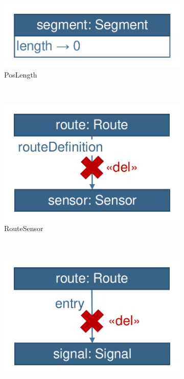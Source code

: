 \begin{figure}
        \centering
        \begin{subfigure}[b]{0.3\textwidth}
        		\centering
                \includegraphics[scale=0.35]{figures/trainbenchmark-transformation-user-poslength}
                \caption{\textsf{PosLength}}
                \label{fig:trainbenchmark-transformation-user-poslength}
        \end{subfigure}
        ~
        \begin{subfigure}[b]{0.3\textwidth}
                \centering
                \includegraphics[scale=0.35]{figures/trainbenchmark-transformation-user-routesensor}
                \caption{\textsf{RouteSensor}}
                \label{fig:trainbenchmark-transformation-user-routesensor}
        \end{subfigure}%
        ~
        \begin{subfigure}[b]{0.3\textwidth}
                \centering
                \includegraphics[scale=0.35]{figures/trainbenchmark-transformation-user-signalneighbor}

\end{subfigure}
\end{figure}
